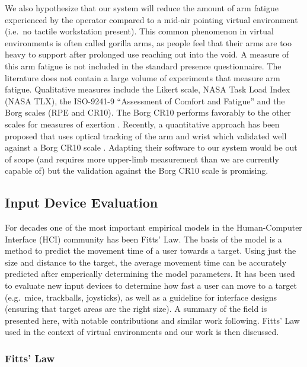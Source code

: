 We also hypothesize that our system will reduce the amount of arm fatigue experienced by the operator compared to a mid-air pointing virtual environment (i.e.\ no tactile workstation present).
This common phenomenon in virtual environments is often called gorilla arms, as people feel that their arms are too heavy to support after prolonged use reaching out into the void.
A measure of this arm fatigue is not included in the standard presence questionnaire.
The literature does not contain a large volume of experiments that measure arm fatigue.
Qualitative measures include the Likert scale, NASA Task Load Index (NASA TLX), the ISO-9241-9 ``Assessment of Comfort and Fatigue'' and the Borg scales (RPE and CR10).
The Borg CR10 performs favorably to the other scales for measures of exertion \citep{grant_comparison_1999}.
Recently, a quantitative approach has been proposed that uses optical tracking of the arm and wrist which validated well against a Borg CR10 scale \citep{hincapie-ramos_consumed_2014}.
Adapting their software to our system would be out of scope (and requires more upper-limb measurement than we are currently capable of) but the validation against the Borg CR10 scale is promising.

\subsection{Input Device Evaluation}
\label{input-device-evaluation}

For decades one of the most important empirical models in the Human-Computer Interface (HCI) community has been Fitts' Law.
The basis of the model is a method to predict the movement time of a user towards a target.
Using just the size and distance to the target, the average movement time can be accurately predicted after emperically determining the model parameters.
It has been used to evaluate new input devices to determine how fast a user can move to a target (e.g.\ mice, trackballs, joysticks), as well as a guideline for interface designs (ensuring that target areas are the right size).
A summary of the field is presented here, with notable contributions and similar work following.
Fitts' Law used in the context of virtual environments and our work is then discussed.

\subsubsection{Fitts' Law}
\label{fitts-law}

